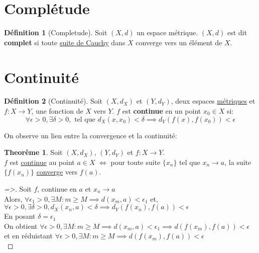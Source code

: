 \documentclass[12pt]{book}
\def\sep{\phantom{}}
\theoremstyle{definition}
\newtheorem{definition}{Définition}[section]
\newtheorem{theorem}{Theorême}[section]
\begin{document}
\section{Complétude}
\begin{definition}[Completude]
    \label{def:completude}
    Soit $(X, d)$ un espace métrique. $(X, d)$ est dit \textbf{complet} si toute \hyperref[def:suite_cauchy]{suite de Cauchy} dans $X$ converge vers un élément de $X$.
\end{definition}

\section{Continuité}
\begin{definition}[Continuité]
    \label{def:continuite}
    Soit $(X, d_X)$ et $(Y, d_Y)$, deux espaces \hyperref[def:metrique]{métriques} et $f: X \to Y$, une fonction de $X$ vers $Y$.
    $f$ est \textbf{continue} en un point $x_0 \in X$ si:
    $$ \forall \epsilon > 0, \exists \delta > 0,\text{ tel que }d_X(x, x_0) < \delta \implies d_Y(f(x), f(x_0)) < \epsilon $$ 
\end{definition}

On observe un lien entre la convergence et la continuité:
\begin{theorem}
    \label{thm:continuite_convergence} Soit $(X, d_X)$, $(Y, d_Y)$ et $f:X \to Y$. \\
    $f$ est  \hyperref[def:continuite]{continue} au point 
    $a \in X$ $\iff$ pour toute suite $\{x_n\}$ tel que $x_n \to a$, la suite $\{f(x_n)\}$ \hyperref[def:convergence_metrique]{converge} vers $f(a)$.
\end{theorem}

\begin{proof}[=>]
    Soit $f$, continue en $a$ et $x_n \to a$ \sep \\
    Alors, $\forall \epsilon_1 > 0, \exists M : m \geq M \implies d(x_m, a) < \epsilon_1$ \sep
    et, $\forall \epsilon > 0, \exists \delta > 0, d_X(x_n, a) < \delta \implies d_Y(f(x_n), f(a)) < \epsilon$ \sep \\
    En posant $\delta = \epsilon_1$ \sep \\
    On obtient $\forall \epsilon > 0, \exists M : m \geq M \implies d(x_m, a) < \epsilon_1 \implies d(f(x_m), f(a)) < \epsilon$ \sep \\
    et en réduistant $\forall \epsilon > 0, \exists M : m \geq M \implies d(f(x_m), f(a)) < \epsilon$ \sep \\
\end{proof}
\end{document}
